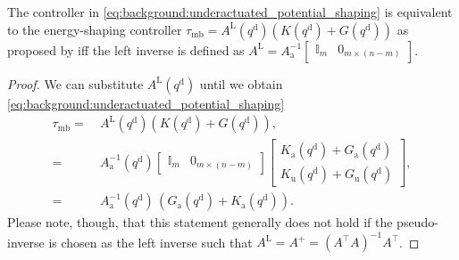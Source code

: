 \begin{remark}
    The controller in \eqref{eq:background:underactuated_potential_shaping} is equivalent to the energy-shaping controller $\tau_\mathrm{mb} = A^\mathrm{L}(q^\mathrm{d}) \left ( K(q^\mathrm{d}) + G(q^\mathrm{d}) \right )$ as proposed by \citet{della2023model} iff the left inverse is defined as $A^\mathrm{L} = A_\mathrm{a}^{-1} \begin{bmatrix}
        \mathbb{I}_m & 0_{m \times (n-m)}
    \end{bmatrix}$.
\end{remark}
\begin{proof}
    We can substitute $A^\mathrm{L}(q^\mathrm{d})$ until we obtain \eqref{eq:background:underactuated_potential_shaping}
    \begin{equation}
    \begin{split}
        \tau_\mathrm{mb} =& \: A^\mathrm{L}(q^\mathrm{d}) \left ( K(q^\mathrm{d}) + G(q^\mathrm{d}) \right ),\\
    =& \: A_\mathrm{a}^{-1}(q^\mathrm{d}) \begin{bmatrix}
        \mathbb{I}_m & 0_{m \times (n-m)}
    \end{bmatrix} \begin{bmatrix}
        K_\mathrm{a}(q^\mathrm{d}) + G_\mathrm{a}(q^\mathrm{d})\\
        K_\mathrm{u}(q^\mathrm{d}) + G_\mathrm{u}(q^\mathrm{d})
    \end{bmatrix},\\
    =& \: A_\mathrm{a}^{-1}(q^\mathrm{d}) \, \left ( G_\mathrm{a}(q^\mathrm{d}) + K_\mathrm{a}(q^\mathrm{d}) \right ).
    \end{split}
    \end{equation}
    Please note, though, that this statement generally does not hold if the pseudo-inverse is chosen as the left inverse such that $A^\mathrm{L} = A^+ = (A^\top A)^{-1} A^\top$.
\end{proof}

